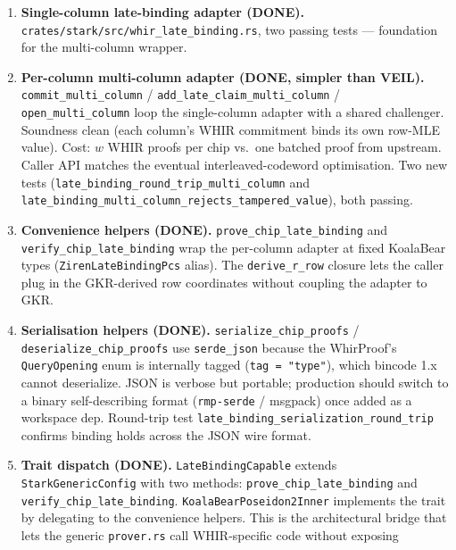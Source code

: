 \begin{enumerate}
  \item \textbf{Single-column late-binding adapter (DONE).}
        \texttt{crates/stark/src/whir\_late\_binding.rs}, two passing
        tests --- foundation for the multi-column wrapper.
  \item \textbf{Per-column multi-column adapter (DONE, simpler than
        VEIL).}
        \texttt{commit\_multi\_column} /
        \texttt{add\_late\_claim\_multi\_column} /
        \texttt{open\_multi\_column} loop the single-column adapter
        with a shared challenger.  Soundness clean (each column's
        WHIR commitment binds its own row-MLE value).  Cost: $w$ WHIR
        proofs per chip vs.~one batched proof from upstream.  Caller
        API matches the eventual interleaved-codeword optimisation.
        Two new tests (\texttt{late\_binding\_round\_trip\_multi\_column}
        and \texttt{late\_binding\_multi\_column\_rejects\_tampered\_value}),
        both passing.
  \item \textbf{Convenience helpers (DONE).}
        \texttt{prove\_chip\_late\_binding} and
        \texttt{verify\_chip\_late\_binding} wrap the per-column
        adapter at fixed KoalaBear types
        (\texttt{ZirenLateBindingPcs} alias).  The \texttt{derive\_r\_row}
        closure lets the caller plug in the GKR-derived row
        coordinates without coupling the adapter to GKR.
  \item \textbf{Serialisation helpers (DONE).}
        \texttt{serialize\_chip\_proofs} /
        \texttt{deserialize\_chip\_proofs} use \texttt{serde\_json}
        because the WhirProof's \texttt{QueryOpening} enum is
        internally tagged (\texttt{tag = "type"}), which bincode 1.x
        cannot deserialize.  JSON is verbose but portable; production
        should switch to a binary self-describing format
        (\texttt{rmp-serde} / msgpack) once added as a workspace dep.
        Round-trip test
        \texttt{late\_binding\_serialization\_round\_trip} confirms
        binding holds across the JSON wire format.
  \item \textbf{Trait dispatch (DONE).}
        \texttt{LateBindingCapable} extends
        \texttt{StarkGenericConfig} with two methods:
        \texttt{prove\_chip\_late\_binding} and
        \texttt{verify\_chip\_late\_binding}.
        \texttt{KoalaBearPoseidon2Inner} implements the trait by
        delegating to the convenience helpers.  This is the
        architectural bridge that lets the generic
        \texttt{prover.rs} call WHIR-specific code without exposing

\end{enumerate}
